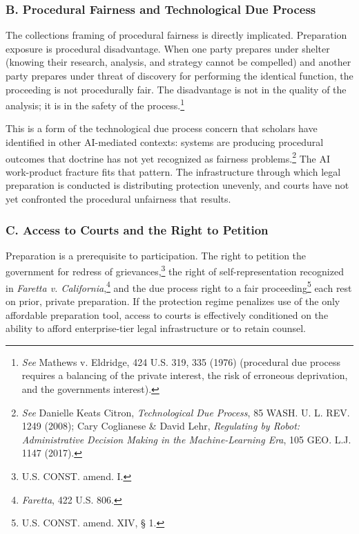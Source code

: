 \documentclass[
  12pt,
]{article}
\begin{document}
\subsubsection{B. Procedural Fairness and Technological Due
Process}\label{b-procedural-fairness-and-technological-due-process}

The collection\textquotesingle s framing of procedural fairness is
directly implicated. Preparation exposure is procedural disadvantage.
When one party prepares under shelter (knowing their research, analysis,
and strategy cannot be compelled) and another party prepares under
threat of discovery for performing the identical function, the
proceeding is not procedurally fair. The disadvantage is not in the
quality of the analysis; it is in the safety of the process.\footnote{\emph{See}
  Mathews v. Eldridge, 424 U.S. 319, 335 (1976) (procedural due process
  requires a balancing of the private interest, the risk of erroneous
  deprivation, and the government\textquotesingle s interest).}

This is a form of the technological due process concern that scholars
have identified in other AI-mediated contexts: systems are producing
procedural outcomes that doctrine has not yet recognized as fairness
problems.\footnote{\emph{See} Danielle Keats Citron, \emph{Technological
  Due Process}, 85 WASH. U. L. REV. 1249 (2008); Cary Coglianese \&
  David Lehr, \emph{Regulating by Robot: Administrative Decision Making
  in the Machine-Learning Era}, 105 GEO. L.J. 1147 (2017).} The AI
work-product fracture fits that pattern. The infrastructure through
which legal preparation is conducted is distributing protection
unevenly, and courts have not yet confronted the procedural unfairness
that results.

\subsubsection{C. Access to Courts and the Right to
Petition}\label{c-access-to-courts-and-the-right-to-petition}

Preparation is a prerequisite to participation. The right to petition
the government for redress of grievances,\footnote{U.S. CONST. amend. I.}
the right of self-representation recognized in \emph{Faretta v.
California},\footnote{\emph{Faretta}, 422 U.S. 806.} and the due process
right to a fair proceeding\footnote{U.S. CONST. amend. XIV, § 1.} each
rest on prior, private preparation. If the protection regime penalizes
use of the only affordable preparation tool, access to courts is
effectively conditioned on the ability to afford enterprise-tier legal
infrastructure or to retain counsel.
\end{document}
